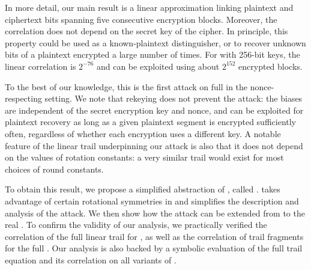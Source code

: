 In more detail, our main result is a linear approximation \cite{eurocryptMatsui93,eurocryptMatsuiY92} linking plaintext and ciphertext bits spanning five consecutive encryption blocks.
Moreover, the correlation does not depend on the secret key of the cipher.
In principle, this property could be used as a known-plaintext distinguisher, or to recover unknown bits of a plaintext encrypted a large number of times.
For \MORUS[1280] with 256-bit keys, the linear correlation is $2^{-76}$
and can be exploited using about $2^{152}$ encrypted blocks.

To the best of our knowledge, this is the first attack on full \MORUS in the nonce-respecting setting.
We note that rekeying does not prevent the attack: the biases are independent of the secret encryption key and nonce, and can be exploited for plaintext recovery as long as a given plaintext segment is encrypted sufficiently often, regardless of whether each encryption uses a different key.
A notable feature of the linear trail underpinning our attack is also that it does not depend on the values of rotation constants: a very similar trail would exist for most choices of round constants.

To obtain this result, we propose a simplified abstraction of \MORUS, called \MiniMORUS. \MiniMORUS takes advantage of certain rotational symmetries in \MORUS and simplifies the description and analysis of the attack. We then show how the attack can be extended from \MiniMORUS to the real \MORUS.
To confirm the validity of our analysis,
we practically verified the correlation of the full linear trail for \MiniMORUS, as well as the correlation of trail fragments for the full \MORUS.
Our analysis is also backed by a symbolic evaluation of the full trail equation and its correlation on all variants of \MORUS.

